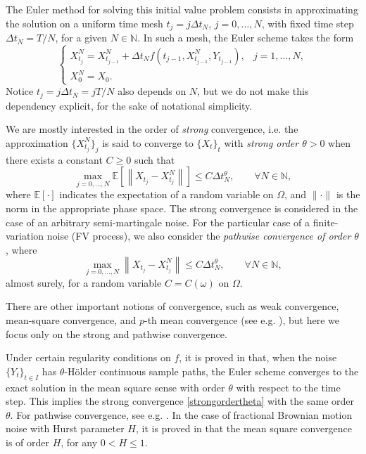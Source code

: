 \documentclass[reqno,12pt]{amsart}
\theoremstyle{plain} %
\theoremstyle{definition} %
\begin{document}
The Euler method for solving this initial value problem consists in approximating the solution on a uniform time mesh $t_j = j\Delta t_N$, $j = 0, \ldots, N$, with fixed time step $\Delta t_N = T/N$, for a given $N\in \mathbb{N}$. In such a mesh, the Euler scheme takes the form
\begin{equation}
  \label{emscheme}
  \begin{cases}
    X_{t_j}^N = X_{t_{j-1}}^N + \Delta t_N f(t_{j-1}, X_{t_{j-1}}^N, Y_{t_{j-1}}), & j = 1, \ldots, N, \\
    X_0^N = X_0.
  \end{cases}
\end{equation}
Notice $t_j = j\Delta t_N = jT/N$ also depends on $N$, but we do not make this dependency explicit, for the sake of notational simplicity.

We are mostly interested in the order of \emph{strong} convergence, i.e. the approximation $\{X_{t_j}^N\}_j$ is said to converge to $\{X_t\}_t$ with \emph{strong order $\theta>0$} when there exists a constant $C \geq 0$ such that
\begin{equation}
    \label{strongordertheta}
    \max_{j=0, \ldots, N}\mathbb{E}\left[ \left\| X_{t_j} - X_{t_j}^N \right\| \right] \leq C \Delta t_N^\theta, \qquad \forall N \in \mathbb{N},
\end{equation}
where $\mathbb{E}[\cdot]$ indicates the expectation of a random variable on $\Omega$, and $\|\cdot\|$ is the norm in the appropriate phase space. The strong convergence is considered in the case of an arbitrary semi-martingale noise. For the particular case of a finite-variation noise (FV process), we also consider the \emph{pathwise convergence of order $\theta$}, where  
\begin{equation}
    \label{pathwiseordertheta}
    \max_{j=0, \ldots, N}\left\| X_{t_j} - X_{t_j}^N \right\| \leq C \Delta t_N^\theta, \qquad \forall N \in \mathbb{N},
\end{equation}
almost surely, for a random variable $C=C(\omega)$ on $\Omega$.

There are other important notions of convergence, such as weak convergence, mean-square convergence, and $p$-th mean convergence (see e.g. \cite{HanKloeden2017,HighamKloeden2021, JentzenKloeden2011}), but here we focus only on the strong and pathwise convergence.

Under certain regularity conditions on $f$, it is proved in \cite[Theorem 3]{WangCaoHanKloeden2021} that, when the noise $\{Y_t\}_{t\in I}$ has $\theta$-H\"older continuous sample paths, the Euler scheme converges to the exact solution in the mean square sense with order $\theta$ with respect to the time step. This implies the strong convergence \eqref{strongordertheta} with the same order $\theta$. For pathwise convergence, see e.g. \cite{GruneKloeden2001,KloedenJentzen2007,JentzenKloeden2011,AsaiKloeden2016,HanKloeden2017}. In the case of fractional Brownian motion noise with Hurst parameter $H$, it is proved in \cite[Theorem 2]{WangCaoHanKloeden2021} that the mean square convergence is of order $H$, for any $0 < H \leq 1.$
\end{document}
